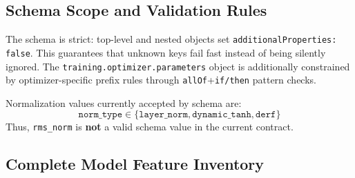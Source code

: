 \subsection{Schema Scope and Validation Rules}
\label{sec:schema-validation}

The schema is strict: top-level and nested objects set \texttt{additionalProperties: false}. This guarantees that unknown keys fail fast instead of being silently ignored. The \texttt{training.optimizer.parameters} object is additionally constrained by optimizer-specific prefix rules through \texttt{allOf}+\texttt{if/then} pattern checks.

Normalization values currently accepted by schema are:
\[
\texttt{norm\_type} \in \{\texttt{layer\_norm}, \texttt{dynamic\_tanh}, \texttt{derf}\}
\]
Thus, \texttt{rms\_norm} is \textbf{not} a valid schema value in the current contract.

\subsection{Complete Model Feature Inventory}

